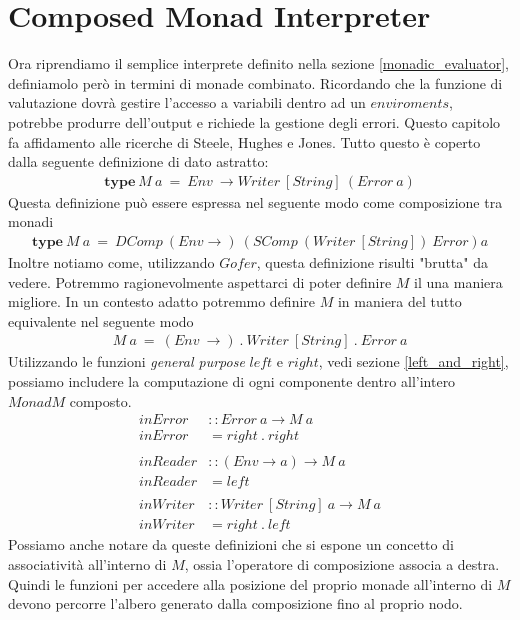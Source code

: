\section{Composed Monad Interpreter}
\label{composed_monad_interpreter}

Ora riprendiamo il semplice interprete definito nella sezione
\ref{monadic_evaluator}, definiamolo però in termini di monade combinato.
Ricordando che la funzione di valutazione dovrà gestire l'accesso a variabili
dentro ad un $enviroments$, potrebbe produrre dell'output e richiede la gestione
degli errori.
Questo capitolo fa affidamento alle ricerche di Steele\cite{steele0},
Hughes\cite{hughes0} e Jones\cite{jones_b0}.
Tutto questo è coperto dalla seguente definizione di dato astratto:
\begin{align*}
  \bm{type}\ M\ a\ =\ Env\ \to Writer\ [String]\ (  Error\ a)
\end{align*}
Questa definizione può essere espressa nel seguente modo come composizione tra
monadi
\begin{align*}
  \bm{type}\ M\ a\ =\ DComp\ (Env \to)\ (SComp\ (Writer\ [String])\ Error) a
\end{align*}
Inoltre notiamo come, utilizzando $Gofer$, questa definizione risulti "brutta"
da vedere.
Potremmo ragionevolmente aspettarci di poter definire $M$ il una maniera migliore.
In un contesto adatto potremmo definire $M$ in maniera del tutto equivalente nel
seguente modo
\begin{align*}
  M\ a\ =\ (Env\ \to)\ .\ Writer\ [String]\ .\ Error\ a
\end{align*}
Utilizzando le funzioni \textit{general purpose} $left$ e $right$, vedi sezione
\ref{left_and_right}, possiamo includere la computazione di ogni componente dentro
all'intero $Monad M$ composto.
\begin{align*}
  inError &:: Error\ a \to M\ a\\
  inError &= right\ .\ right\\\\
  inReader &:: (Env \to a) \to M\ a\\
  inReader &= left\\\\
  inWriter &:: Writer\ [String]\ a \to M\ a\\
  inWriter &= right\ .\ left
\end{align*}
Possiamo anche notare da queste definizioni che si espone un concetto di associatività
all'interno di $M$, ossia l'operatore di composizione associa a destra.
Quindi le funzioni per accedere alla posizione del proprio monade all'interno di
$M$ devono percorre l'albero generato dalla composizione fino al proprio nodo.\\

